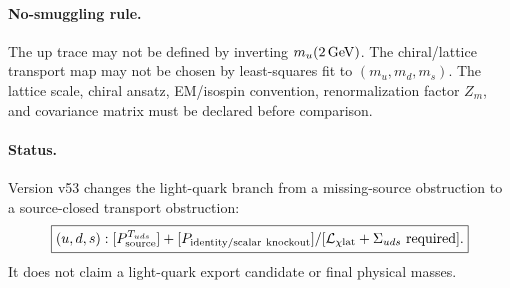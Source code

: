 \paragraph{No-smuggling rule.}
The up trace may not be defined by inverting \(m_u(2\,{\rm GeV})\).  The
chiral/lattice transport map may not be chosen by least-squares fit to
\((m_u,m_d,m_s)\).  The lattice scale, chiral ansatz, EM/isospin convention,
renormalization factor \(Z_m\), and covariance matrix must be declared before
comparison.

\paragraph{Status.}
Version v53 changes the light-quark branch from a missing-source obstruction to
a source-closed transport obstruction:
\[
\boxed{
(u,d,s):[P_{\rm source}^{T_{uds}}]
+[P_{\rm identity/scalar\ knockout}]
/[\mathcal L_{\chi{\rm lat}}+\Sigma_{uds}\ {\rm required}].
}
\]
It does not claim a light-quark export candidate or final physical masses.
